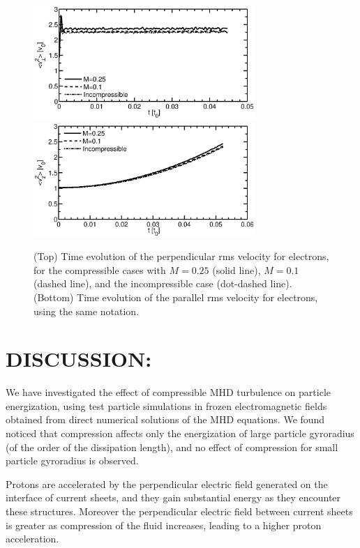 \documentclass[%
aip,pop,amsmath,amssymb,
 reprint,%
]{revtex4-1}
\begin{document}
{{\begin{figure}[<t>]
\begin{center}
{\includegraphics[width = 3.3in]{./Figures/Fig7_a}}
{\includegraphics[width = 3.3in]{./Figures/Fig7_b}}
\caption{(Top) Time evolution of the perpendicular rms velocity for
electrons, for the compressible cases with $M=0.25$ (solid line), 
$M=0.1$ (dashed line), and the incompressible case (dot-dashed line). (Bottom) Time 
evolution of the parallel rms velocity for electrons, using the same notation.} 
\end{center}
\label{mean square velocity}
\end{figure}


\section{\label{sec:level4}DISCUSSION:}
We have investigated the effect of compressible MHD turbulence 
on particle energization, using test particle simulations in frozen electromagnetic fields
obtained from direct numerical solutions of the MHD equations. We found noticed that 
compression affects only the energization of large particle gyroradius (of the order of the 
dissipation length), and no effect of compression for small particle gyroradius is observed. 

Protons are accelerated by the perpendicular electric field generated on the interface of
current sheets, and they gain substantial energy as they encounter these structures. 
Moreover the perpendicular electric field between current sheets is greater as compression
of the fluid increases, leading to a higher proton acceleration. 

}}
\end{document}
